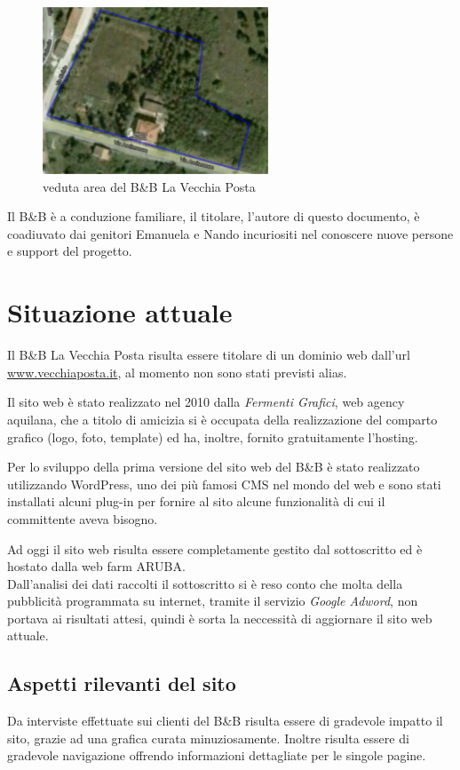 \documentclass[a4paper,12pt,hidelinks]{report}
\begin{document}
  \begin{figure}[h!]%
    \includegraphics[width=0.6\textwidth,keepaspectratio=true]{img/bbArea1}
    \centering
    \caption{veduta area del B\&B La Vecchia Posta}%
    \label{fig:bbArea}%
  \end{figure}
  Il B\&B è a conduzione familiare, il titolare, l'autore di questo documento, è coadiuvato dai genitori Emanuela e Nando incuriositi nel conoscere nuove persone 
  e support del progetto.

\section{Situazione attuale}
  Il B\&B La Vecchia Posta risulta essere titolare di un dominio web dall'url \url{www.vecchiaposta.it}, al momento non sono stati previsti alias. 
  \par Il sito web è stato realizzato nel 2010 dalla \textit{Fermenti Grafici}, web agency aquilana, che a titolo di amicizia si è occupata della realizzazione
  del comparto grafico (logo, foto, template) ed ha, inoltre, fornito gratuitamente l'hosting.
  \par Per lo sviluppo della prima versione del sito web del B\&B è stato realizzato utilizzando WordPress, uno dei più famosi CMS nel mondo del web e sono stati 
  installati alcuni plug-in per fornire al sito alcune funzionalità di cui il committente aveva bisogno.
  \par Ad oggi il sito web risulta essere completamente gestito dal sottoscritto ed è hostato dalla web farm ARUBA.
  \\Dall'analisi dei dati raccolti il sottoscritto si è reso conto che molta della pubblicità programmata su internet, tramite il servizio \textit{Google Adword}, 
  non portava ai risultati attesi, quindi è sorta la neccessità di aggiornare il sito web attuale.

\subsection{Aspetti rilevanti del sito}
  Da interviste effettuate sui clienti del B\&B risulta essere di gradevole impatto il sito, grazie ad una grafica curata minuziosamente.
  Inoltre risulta essere di gradevole navigazione offrendo informazioni dettagliate per le singole pagine.
\end{document}
